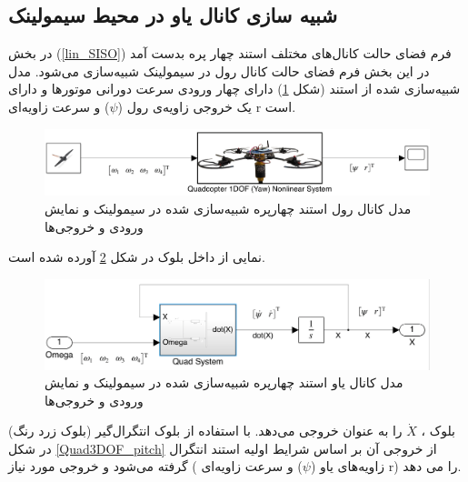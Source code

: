 \subsection{شبیه سازی کانال یاو در محیط سیمولینک}
در بخش
(\ref{lin_SISO})
فرم فضای حالت کانال‌های مختلف استند چهار پره بدست آمد در این بخش فرم فضای حالت کانال رول در سیمولینک شبیه‌سازی می‌شود.
مدل شبیه‌سازی شده از استند (شکل \ref{yaw_simulink}) دارای چهار ورودی سرعت دورانی موتورها  و دارای یک خروجی زاویه‌ی رول ($\psi$) و  سرعت زاویه‌ای r است.
\begin{figure}[H]
	\includegraphics[width=16cm]{../Figures/QuadSimulation/yaw_Stand_Model.png}
	\centering
	\vspace*{-15mm}
	\caption{مدل کانال رول استند چهارپره شبیه‌سازی شده در سیمولینک و نمایش ورودی و خروجی‌ها}
	\label{yaw_simulink}
\end{figure}

نمایی از داخل بلوک
در شکل \ref{Quad1DOF_yaw} آورده شده است.
\begin{figure}[H]
	\includegraphics[width=16cm]{../Figures/QuadSimulation/yaw_Integrator.png}
	\centering
	\vspace*{-15mm}
	\caption{مدل کانال یاو استند چهارپره شبیه‌سازی شده در سیمولینک و نمایش ورودی و خروجی‌ها}
	\label{Quad1DOF_yaw}
\end{figure}
بلوک
،
$\dot X$ را به عنوان خروجی می‌دهد. با استفاده از بلوک انتگرال‌گیر (بلوک زرد رنگ) در شکل
\ref{Quad3DOF_pitch}
از خروجی آن بر اساس شرایط اولیه استند انتگرال گرفته می‌شود و خروجی مورد نیاز ( زاویه‌های یاو ($\psi$) و سرعت زاویه‌ای‌
r)
را می دهد.

